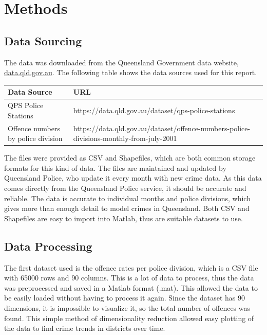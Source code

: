 \documentclass[]{article}
\begin{document}
\section{Methods}

\subsection{Data Sourcing}

The data was downloaded from the Queensland Government data website, \url{data.qld.gov.au}. 
The following table shows the data sources used for this report.

\begin{table}
    \centering
    \begin{tabular}{|p{4cm}|p{10cm}|}
        \hline
        Data Source & URL \\
        \hline
        QPS Police Stations & https://data.qld.gov.au/dataset/qps-police-stations \\ 
        Offence numbers by police division & https://data.qld.gov.au/dataset/offence-numbers-police-divisions-monthly-from-july-2001 \\
        \hline
    \end{tabular}
\end{table}

The files were provided as CSV and Shapefiles, which are both common storage formats for this kind of data.
The files are maintained and updated by Queensland Police, who update it every month with new crime data.
As this data comes directly from the Queensland Police service, it should be accurate and reliable.
The data is accurate to individual months and police divisions, which gives more than enough detail to model crimes in Queensland.
Both CSV and Shapefiles are easy to import into Matlab, thus are suitable datasets to use.

\subsection{Data Processing}

The first dataset used is the offence rates per police division\cite{noauthor_offence_nodate}, which is a CSV file with 65000 rows and 90 columns.
This is a lot of data to process, thus the data was preprocessed and saved in a Matlab format (.mat).
This allowed the data to be easily loaded without having to process it again.
Since the dataset has 90 dimensions, it is impossible to visualize it, so the total number of offences was found.
This simple method of dimensionality reduction allowed easy plotting of the data to find crime trends in districts over time.
\end{document}
